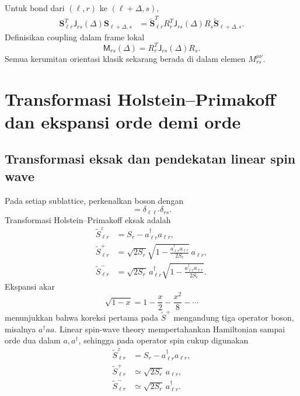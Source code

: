 \documentclass[11pt,a4paper]{article}
\newcommand{\vS}{\bm S}
\newcommand{\mJ}{\mathsf J}
\newcommand{\mM}{\mathsf M}
\begin{document}
Untuk bond dari $(\ell,r)$ ke $(\ell+\Delta,s)$,
\begin{align}
\vS_{\ell r}^T\mJ_{rs}(\Delta)\vS_{\ell+\Delta,s}
&=\widetilde{\vS}_{\ell r}^T
R_r^T\mJ_{rs}(\Delta)R_s
\widetilde{\vS}_{\ell+\Delta,s}.
\end{align}
Definisikan coupling dalam frame lokal
\begin{equation}
\boxed{
\mM_{rs}(\Delta)=R_r^T\mJ_{rs}(\Delta)R_s.}
\label{eq:local-coupling}
\end{equation}
Semua kerumitan orientasi klasik sekarang berada di dalam elemen $M_{rs}^{\mu\nu}$.

\section{Transformasi Holstein--Primakoff dan ekspansi orde demi orde}

\subsection{Transformasi eksak dan pendekatan linear spin wave}

Pada setiap sublattice, perkenalkan boson dengan
\begin{equation}
[a_{\ell r},a_{\ell' s}^\dagger]
=\delta_{\ell\ell'}\delta_{rs}.
\end{equation}
Transformasi Holstein--Primakoff eksak adalah
\begin{align}
\widetilde S_{\ell r}^z&=S_r-a_{\ell r}^\dagger a_{\ell r},\label{eq:hp-z}\\
\widetilde S_{\ell r}^+&=\sqrt{2S_r}
\sqrt{1-\frac{a_{\ell r}^\dagger a_{\ell r}}{2S_r}}\,a_{\ell r},\\
\widetilde S_{\ell r}^-&=\sqrt{2S_r}\,
a_{\ell r}^\dagger
\sqrt{1-\frac{a_{\ell r}^\dagger a_{\ell r}}{2S_r}}.
\end{align}
Ekspansi akar
\begin{equation}
\sqrt{1-x}=1-\frac{x}{2}-\frac{x^2}{8}-\cdots
\end{equation}
menunjukkan bahwa koreksi pertama pada $\widetilde S^+$ mengandung tiga operator boson, misalnya $a^\dagger aa$. Linear spin-wave theory mempertahankan Hamiltonian sampai orde dua dalam $a,a^\dagger$, sehingga pada operator spin cukup digunakan
\begin{align}
\widetilde S_{\ell r}^z&=S_r-a_{\ell r}^\dagger a_{\ell r},\\
\widetilde S_{\ell r}^+&\simeq\sqrt{2S_r}\,a_{\ell r},\\
\widetilde S_{\ell r}^-&\simeq\sqrt{2S_r}\,a_{\ell r}^\dagger.
\end{align}
\end{document}
